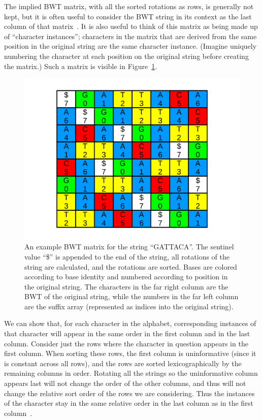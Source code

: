 The implied BWT matrix, with all the sorted rotations as rows, is generally not kept, but it is often useful to consider the BWT string in its context as the last column of that matrix~\cite{burrows1994block, ferragina2000opportunistic}. It is also useful to think of this matrix as being made up of ``character instances''; characters in the matrix that are derived from the same position in the original string are the same character instance. (Imagine uniquely numbering the character at each position on the original string before creating the matrix.) Such a matrix is visible in Figure~\ref{fig:bwt}.

\begin{figure}[ht]
    \centering
    \includegraphics[width=1.0\textwidth]{figures/01_introduction/bwt.png}
    \caption[An example BWT matrix for the string ``GATTACA'']{An example BWT matrix for the string ``GATTACA''. The sentinel value ``\$'' is appended to the end of the string, all rotations of the string are calculated, and the rotations are sorted. Bases are colored according to base identity and numbered according to position in the original string. The characters in the far right column are the BWT of the original string, while the numbers in the far left column are the suffix array (represented as indices into the original string).}
    \label{fig:bwt}
\end{figure}

We can show that, for each character in the alphabet, corresponding instances of that character will appear in the same order in the first column and in the last column. Consider just the rows where the character in question appears in the first column. When sorting these rows, the first column is uninformative (since it is constant across all rows), and the rows are sorted lexicographically by the remaining columns in order. Rotating all the strings so the uninformative column appears last will not change the order of the other columns, and thus will not change the relative sort order of the rows we are considering. Thus the instances of the character stay in the same relative order in the last column as in the first column~\cite{langmead2013introduction}.
    
